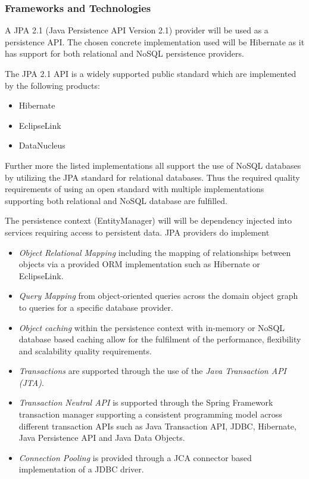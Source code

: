 \subsubsection{Frameworks and Technologies}
A JPA 2.1 (Java Persistence API Version 2.1) provider will be used as a
persistence API. The chosen concrete implementation used will be Hibernate as
it has support for both relational and NoSQL persistence providers.

The JPA 2.1 API is a widely supported public standard which are implemented by
the following products:
\begin{itemize}
	\item Hibernate
	\item EclipseLink
	\item DataNucleus
\end{itemize}

Further more the listed implementations all support the use of NoSQL databases
by utilizing the JPA standard for relational databases. Thus the required
quality requirements of using an open standard with multiple implementations
supporting both relational and NoSQL database are fulfilled.

The persistence context (EntityManager) will will be dependency injected into
services requiring access to persistent data. JPA providers do implement
\begin{itemize}
	\item \textit{Object Relational Mapping} including the mapping of
		relationships between objects via a provided ORM
		implementation such as Hibernate or EclipseLink.
	\item \textit{Query Mapping} from object-oriented queries across the
		domain object graph to queries for a specific database provider.
	\item \textit{Object caching} within the persistence context with
		in-memory or NoSQL database based caching allow for the
		fulfilment of the performance, flexibility and scalability
		quality requirements.
	\item \textit{Transactions} are supported through the use of the \textit{Java Transaction API (JTA)}.
	\item \textit{Transaction Neutral API} is supported through the Spring
		Framework transaction manager supporting a consistent programming
		model across different transaction APIs such as
		Java Transaction API, JDBC, Hibernate, Java Persistence API and
		Java Data Objects.
	\item \textit{Connection Pooling} is provided through a JCA connector
		based implementation of a JDBC driver.
\end{itemize}

